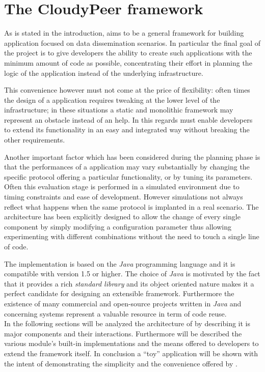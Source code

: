 \chapter{The CloudyPeer framework}
As is stated in the
introduction, \cloudypeer aims to be a general framework for building
\ptop application focused on data dissemination scenarios.
In particular the final goal of the project is to give developers the
ability to create such applications with the minimum amount of code as
possible, concentrating their effort in planning the logic of the
application instead of the underlying \ptop infrastructure.

This convenience however must not come at the price of
flexibility: often times the design of a \ptop application requires
tweaking at the lower level of the infrastructure; in these situations
a static and monolithic framework may represent an obstacle instead of
an help.
In this regards \cloudypeer must enable developers to extend its
functionality in an easy and integrated way without breaking the other
requirements.

Another important factor which has been considered during the
planning phase is that the performances of a \ptop application may
vary substantially by changing the specific protocol offering a
particular functionality, or by tuning its parameters. Often this
evaluation stage is performed in a simulated environment due to timing
constraints and ease of development. However simulations not always
reflect what happens when the same protocol is implanted in a real
scenario.
The \cloudypeer architecture has been explicitly designed to allow the change
of every single component by simply modifying a configuration
parameter thus allowing experimenting with different
combinations without the need to touch a single line of code.

The implementation is based on the \emph{Java} programming language
and it is compatible with version 1.5 or higher. The
choice of \emph{Java} is motivated by the fact that it provides a rich
\emph{standard library} and its object oriented nature makes it a
perfect candidate for designing an extensible framework. Furthermore
the existence of many commercial and open-source projects written in
\emph{Java} and concerning \ptop systems represent a valuable resource
in term of code reuse.
\ \\
In the following sections will be analyzed the architecture of
\cloudypeer by describing it is major components and their interactions.
Furthermore will be described the various module's
built-in implementations and the means offered to developers to extend
the framework itself.
In conclusion a ``toy'' application will be shown with the intent of
demonstrating the simplicity and the convenience offered by
\cloudypeer.

